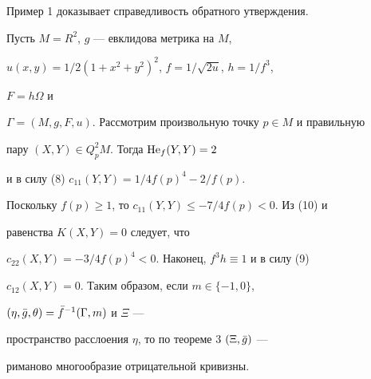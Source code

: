  


Пример 1 доказывает справедливость обратного утверждения. 


 


\begin{exam} Пусть $M=R^2$, $g$ --- евклидова метрика на $M$, 


$u(x,y)=1/2(1+x^2+y^2)^2$, $f=1/\sqrt{2u}$, $h=1/f^3$, 


$F=h\Omega$ и 


$\Gamma=(M,g,F,u)$. Рассмотрим произвольную точку $p\in M$ и правильную 


пару $(X,Y)\in Q^2_pM$. Тогда $\operatorname{He}_f(Y,Y)=2$ 


и в силу (8) $c_{11}(Y,Y)=1/4f(p)^4-2/f(p)$. 


Поскольку $f(p)\ge 1$, то $c_{11}(Y,Y)\le-7/4f(p)<0$. Из (10) и 


равенства $K(X,Y)=0$ следует, что 


$c_{22}(X,Y)=-3/4f(p)^4<0$. Наконец, $f^3h\equiv1$ и в силу (9) 


$c_{12}(X,Y)=0$. Таким образом, если $m\in\{-1,0\}$, 


$(\eta,\Bar g,\theta)=\Bar f^{-1}(\Gamma,m)$ и $\Xi$ --- 


пространство расслоения $\eta$, то по теореме 3 $(\Xi,\Bar g)$ --- 


риманово многообразие отрицательной кривизны.


\end{exam} 


 


